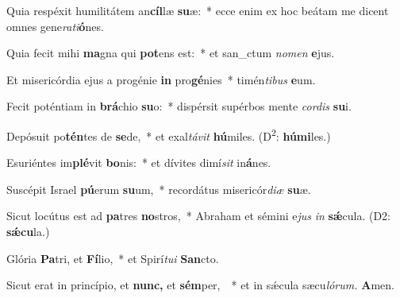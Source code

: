\item Quia respéxit humilitátem an\textbf{cíl}læ \textbf{su}æ:~* ecce enim ex hoc beátam me dicent omnes gene\textit{rati}\textbf{ó}nes.
\item Quia fecit mihi \textbf{ma}gna qui \textbf{pot}ens est:~* et san\_ctum \textit{nomen} \textbf{e}jus.
\item Et misericórdia ejus a progénie \textbf{in} pro\textbf{gé}nies~* timén\textit{tibus} \textbf{e}um.
\item Fecit poténtiam in \textbf{brá}chio \textbf{su}o:~* dispérsit supérbos mente \textit{cordis} \textbf{su}i.
\item Depósuit po\textbf{tén}tes de \textbf{se}de,~* et exal\textit{távit} \textbf{hú}miles. (D\textsuperscript{2}: \textbf{húmi}les.)
\item Esuriéntes im\textbf{plé}vit \textbf{bo}nis:~* et dívites dimí\hspace{0.02em}\textit{sit} in\textbf{á}nes.
\item Suscépit Israel \textbf{pú}erum \textbf{su}um,~* recordátus misericór\textit{diæ} \textbf{su}æ.
\item Sicut locútus est ad \textbf{pa}tres \textbf{no}stros,~* Abraham et sémini e\hspace{0.02em}\textit{jus} \textit{in} \textbf{sǽ}cula. (D2: \textbf{sǽcu}la.)
\item Glória \textbf{Pa}tri, et \textbf{Fí}lio,~* et Spirí\tinyhspace\textit{tui} \textbf{San}cto.
\item Sicut erat in princípio, et \textbf{nunc,} et \textbf{sém}per, ~* et in sǽcula sæcu\tinyhspace\textit{lórum.} \textbf{A}men.
